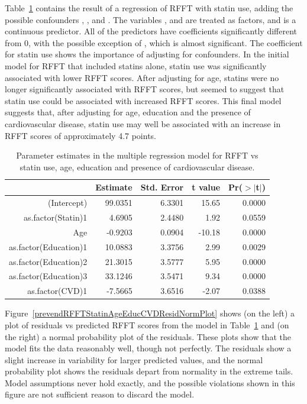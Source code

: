 Table~\ref{prevendRFFTStatinAgeEducationCVD} contains the result of a regression of RFFT with statin use, adding the possible confounders , , and . The variables ,  and  are treated as factors, and  is a continuous predictor.  All of the predictors have coefficients significantly different from 0, with the possible exception of , which is almost significant.  The coefficient for statin use shows the importance of adjusting for confounders.  In the initial model for RFFT that included statins alone, statin use was significantly associated with lower RFFT scores.  After adjusting for age, statins were no longer significantly associated with RFFT scores, but seemed to suggest that statin use could be associated with increased RFFT scores.  This final model suggests that, after adjusting for age, education and the presence of cardiovascular disease, statin use may well be associated with an increase in RFFT scores of approximately 4.7 points.
\begin{table}[ht]
\centering
\begin{tabular}{rrrrr}
  \hline
 & Estimate & Std. Error & t value & Pr($>$$|$t$|$) \\ 
  \hline
(Intercept) & 99.0351 & 6.3301 & 15.65 & 0.0000 \\ 
  as.factor(Statin)1 & 4.6905 & 2.4480 & 1.92 & 0.0559 \\ 
  Age & -0.9203 & 0.0904 & -10.18 & 0.0000 \\ 
  as.factor(Education)1 & 10.0883 & 3.3756 & 2.99 & 0.0029 \\ 
  as.factor(Education)2 & 21.3015 & 3.5777 & 5.95 & 0.0000 \\ 
  as.factor(Education)3 & 33.1246 & 3.5471 & 9.34 & 0.0000 \\ 
  as.factor(CVD)1 & -7.5665 & 3.6516 & -2.07 & 0.0388 \\ 
   \hline
\end{tabular}
\caption{Parameter estimates in the multiple 
       regression model for RFFT vs statin use, age, 
       education and presence of cardiovascular disease.} 
\label{prevendRFFTStatinAgeEducationCVD}
\end{table}

Figure~\ref{prevendRFFTStatinAgeEducCVDResidNormPlot} shows (on the left) a plot of residuals vs predicted RFFT scores from the model in Table~\ref{prevendRFFTStatinAgeEducationCVD} and (on the right) a normal probability plot of the residuals.  These plots show that the model fits the data reasonably well, though not perfectly.  The residuals show a slight increase in variability for larger predicted values, and the normal probability plot shows the residuals depart from normality in the extreme tails.  Model assumptions never hold exactly, and the possible violations shown in this figure are not sufficient reason to discard the model.


